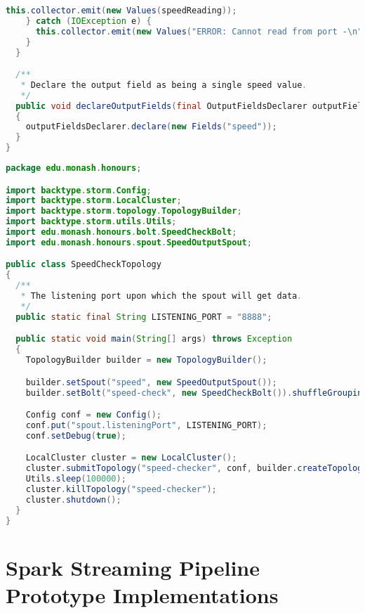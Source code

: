 \begin{lstlisting}[language=java,caption=edu.monash.honours.spout.SpeedOutputSpout (Java)]
      this.collector.emit(new Values(speedReading));
    } catch (IOException e) {
      this.collector.emit(new Values("ERROR: Cannot read from port -\n" + e.getMessage()));
    }
  }

  /**
   * Declare the output field as being a single speed value.
   */
  public void declareOutputFields(final OutputFieldsDeclarer outputFieldsDeclarer)
  {
    outputFieldsDeclarer.declare(new Fields("speed"));
  }
}
\end{lstlisting}
\clearpage

\begin{lstlisting}[language=java,caption=edu.monash.honours.SpeedCheckTopology (Java)]
package edu.monash.honours;

import backtype.storm.Config;
import backtype.storm.LocalCluster;
import backtype.storm.topology.TopologyBuilder;
import backtype.storm.utils.Utils;
import edu.monash.honours.bolt.SpeedCheckBolt;
import edu.monash.honours.spout.SpeedOutputSpout;

public class SpeedCheckTopology
{
  /**
   * The listening port upon which the spout will get data.
   */
  public static final String LISTENING_PORT = "8888";

  public static void main(String[] args) throws Exception
  {
    TopologyBuilder builder = new TopologyBuilder();

    builder.setSpout("speed", new SpeedOutputSpout());
    builder.setBolt("speed-check", new SpeedCheckBolt()).shuffleGrouping("speed");

    Config conf = new Config();
    conf.put("spout.listeningPort", LISTENING_PORT);
    conf.setDebug(true);

    LocalCluster cluster = new LocalCluster();
    cluster.submitTopology("speed-checker", conf, builder.createTopology());
    Utils.sleep(100000);
    cluster.killTopology("speed-checker");
    cluster.shutdown();
  }
}
\end{lstlisting}

\clearpage
\chapter{Spark Streaming Pipeline Prototype Implementations}
\label{lst:spark}

